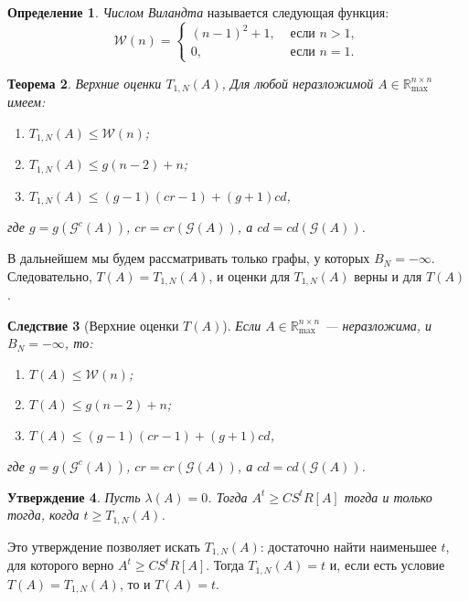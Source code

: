 \documentclass[12pt]{article}
\newtheorem{theorem}{Теорема}[section]
\newtheorem{proposition}[theorem]{Утверждение}
\newtheorem{corollary}[theorem]{Следствие}
\theoremstyle{definition}
\newtheorem{definition}[theorem]{Определение}
\begin{document}
\begin{definition}
\textit{Числом Виландта} называется следующая функция:
\begin{equation*}
\mathcal{W}(n) = \begin{cases}
(n - 1)^2 + 1, &\text{ если } n > 1, \\
0, & \text{ если } n = 1.
\end{cases}
\end{equation*}
\end{definition}

\begin{theorem} Верхние оценки $T_{1, N}(A)$, \cite[теорема 4.1]{15WeakCSRExpantion}
Для любой неразложимой $A \in \mathbb{R}_{\max}^{n \times n}$ имеем:
\begin{enumerate} 
    \item $T_{1, N}(A) \le \mathcal{W}(n)$;
    \item $T_{1, N}(A) \le g(n - 2) + n$;
    \item $T_{1, N}(A) \le (g - 1)(cr - 1) + (g + 1) cd$,
\end{enumerate}
где $g = g(\mathcal{G}^c(A))$, $cr = cr(\mathcal{G}(A))$, а $cd = cd(\mathcal{G}(A))$.
\end{theorem}

В дальнейшем мы будем рассматривать только графы, у которых $B_N = -\infty$. Следовательно, $T(A) = T_{1, N}(A)$, и оценки для $T_{1, N}(A)$ верны и для $T(A)$.

\begin{corollary} [Верхние оценки $T(A)$]
\label{upperBounds}
Если $A \in \mathbb{R}_{\max}^{n \times n}$ --- неразложима, и $B_N = -\infty$, то:
\begin{enumerate} 
    \item $T(A) \le \mathcal{W}(n)$;
    \item $T(A) \le g(n - 2) + n$;
    \item $T(A) \le (g - 1)(cr - 1) + (g + 1) cd$,
\end{enumerate}
где $g = g(\mathcal{G}^c(A))$, $cr = cr(\mathcal{G}(A))$, а $cd = cd(\mathcal{G}(A))$.
\end{corollary}

\begin{proposition} \cite[лемма 2.3]{bounds}
\label{findT1}
Пусть $\lambda(A) = 0$. Тогда $A^t \ge CS^tR[A]$ тогда и только тогда, когда $t \ge T_{1,N}(A)$.
\end{proposition}

Это утверждение позволяет искать $T_{1, N}(A)$: достаточно найти наименьшее $t$, для которого верно $A^t \ge CS^tR[A]$. Тогда $T_{1, N}(A) = t$ и, если есть условие $T(A) = T_{1, N}(A)$, то и $T(A) = t$.
\end{document}
